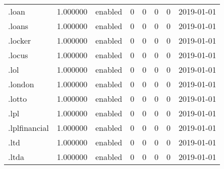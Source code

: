 \begin{tabular}{lrlrrrrl}
.loan                     &          1.000000 &         enabled &                           0 &                           0 &                           0 &                   0 &           2019-01-01 \\
.loans                    &          1.000000 &         enabled &                           0 &                           0 &                           0 &                   0 &           2019-01-01 \\
.locker                   &          1.000000 &         enabled &                           0 &                           0 &                           0 &                   0 &           2019-01-01 \\
.locus                    &          1.000000 &         enabled &                           0 &                           0 &                           0 &                   0 &           2019-01-01 \\
.lol                      &          1.000000 &         enabled &                           0 &                           0 &                           0 &                   0 &           2019-01-01 \\
.london                   &          1.000000 &         enabled &                           0 &                           0 &                           0 &                   0 &           2019-01-01 \\
.lotto                    &          1.000000 &         enabled &                           0 &                           0 &                           0 &                   0 &           2019-01-01 \\
.lpl                      &          1.000000 &         enabled &                           0 &                           0 &                           0 &                   0 &           2019-01-01 \\
.lplfinancial             &          1.000000 &         enabled &                           0 &                           0 &                           0 &                   0 &           2019-01-01 \\
.ltd                      &          1.000000 &         enabled &                           0 &                           0 &                           0 &                   0 &           2019-01-01 \\
.ltda                     &          1.000000 &         enabled &                           0 &                           0 &                           0 &                   0 &           2019-01-01 \\

\end{tabular}
